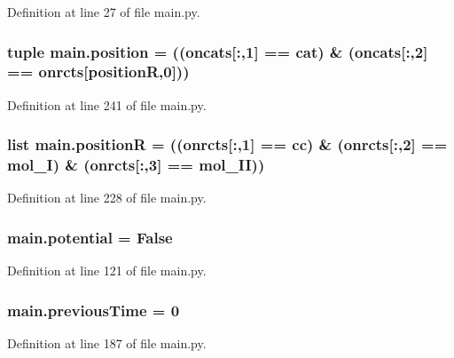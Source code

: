 Definition at line 27 of file main.\+py.

\hypertarget{a00153_ac67c60df3cc9afae7e4888d2b48b846d}{
\subsubsection[{position}]{\setlength{\rightskip}{0pt plus 5cm}tuple main.\+position = (({\bf oncats}\mbox{[}\+:,1\mbox{]} == {\bf cat}) \& ({\bf oncats}\mbox{[}\+:,2\mbox{]} == {\bf onrcts}\mbox{[}{\bf position\+R},0\mbox{]}))}}\label{a00153_ac67c60df3cc9afae7e4888d2b48b846d}


Definition at line 241 of file main.\+py.

\hypertarget{a00153_adbbdc0f6ad0f08400b3e492f7a807a6b}{
\subsubsection[{position\+R}]{\setlength{\rightskip}{0pt plus 5cm}list main.\+position\+R = (({\bf onrcts}\mbox{[}\+:,1\mbox{]} == {\bf cc}) \& ({\bf onrcts}\mbox{[}\+:,2\mbox{]} == {\bf mol\+\_\+\+I}) \& ({\bf onrcts}\mbox{[}\+:,3\mbox{]} == {\bf mol\+\_\+\+I\+I}))}}\label{a00153_adbbdc0f6ad0f08400b3e492f7a807a6b}


Definition at line 228 of file main.\+py.

\hypertarget{a00153_abe4c267a63409b1b7cd9c6aaf0779b4a}{
\subsubsection[{potential}]{\setlength{\rightskip}{0pt plus 5cm}main.\+potential = False}}\label{a00153_abe4c267a63409b1b7cd9c6aaf0779b4a}


Definition at line 121 of file main.\+py.

\hypertarget{a00153_a6a6de947e3b6ada5ea6e761d208228bd}{
\subsubsection[{previous\+Time}]{\setlength{\rightskip}{0pt plus 5cm}main.\+previous\+Time = 0}}\label{a00153_a6a6de947e3b6ada5ea6e761d208228bd}


Definition at line 187 of file main.\+py.

